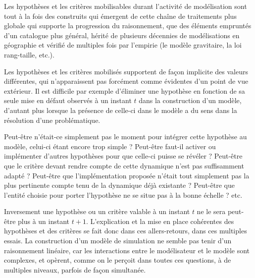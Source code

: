 Les hypothèses et les critères mobilisables durant l'activité de modélisation sont tout à la fois des construits qui émergent de cette chaîne de traitements plus globale qui supporte la progression du raisonnement, que des éléments empruntés d'un catalogue plus général, hérité de plusieurs décennies de modélisations en géographie et vérifié de multiples fois par l'empirie (le modèle gravitaire, la loi rang-taille, etc.). 

Les hypothèses et les critères mobilisés supportent de façon implicite des valeurs différentes, qui n'apparaissent pas forcément comme évidentes d'un point de vue extérieur. Il est difficile par exemple d'éliminer une hypothèse en fonction de sa seule mise en défaut observés à un instant $t$ dans la construction d'un modèle, d'autant plus lorsque la présence de celle-ci dans le modèle a du sens dans la résolution d'une problématique.

Peut-être n'était-ce simplement pas le moment pour intégrer cette hypothèse au modèle, celui-ci étant encore trop simple ? Peut-être faut-il activer ou implémenter d'autres hypothèses pour que celle-ci puisse se révéler ? Peut-être que le critère devant rendre compte de cette dynamique n'est pas suffisamment adapté ? Peut-être que l'implémentation proposée n'était tout simplement pas la plus pertinente compte tenu de la dynamique déjà existante ? Peut-être que l'entité choisie pour porter l'hypothèse ne se situe pas à la bonne échelle ?  etc. 

Inversement une hypothèse ou un critère valable à un instant $t$ ne le sera peut-être plus à un instant $t + 1$. L'explication et la mise en place cohérentes des hypothèses et des critères se fait donc dans ces allers-retours, dans ces multiples essais. La construction d'un modèle de simulation ne semble pas tenir d'un raisonnement linéaire, car les interactions entre le modélisateur et le modèle sont complexes, et opèrent, comme on le perçoit dans toutes ces questions, à de multiples niveaux, parfois de façon simultanée.

